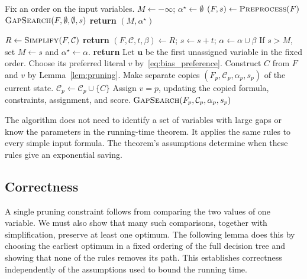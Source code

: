 \documentclass[11pt,a4paper]{article}
\theoremstyle{definition}
\theoremstyle{remark}
\begin{document}
\begin{algorithm}[H]
\caption{\textnormal{\textsc{LiteralGap}}$(F)$}\label{alg:literal_gap}
\begin{algorithmic}[1]
\STATE Fix an order on the input variables.
\STATE $M\gets-\infty$; $\alpha^\star\gets\emptyset$
\STATE $(F,s)\gets\textnormal{\textsc{Preprocess}}(F)$
\STATE $\textnormal{\textsc{GapSearch}}(F,\emptyset,\emptyset,s)$
\STATE \textbf{return} $(M,\alpha^\star)$
\end{algorithmic}
\end{algorithm}

\begin{algorithm}[H]
\caption{\textnormal{\textsc{GapSearch}}$(F,\mathcal C,\alpha,s)$}
\label{alg:gap_search}\label{alg:bias}
\begin{algorithmic}[1]
\STATE $R\gets\textnormal{\textsc{Simplify}}(F,\mathcal C)$
  \STATE \textbf{return}
\ENDIF
\STATE $(F,\mathcal C,t,\beta)\gets R$; $s\gets s+t$; $\alpha\gets\alpha\cup\beta$
  \STATE If $s>M$, set $M\gets s$ and $\alpha^\star\gets\alpha$.
  \STATE \textbf{return}
\ENDIF
\STATE Let $\mathbf u$ be the first unassigned variable in the fixed order.
\STATE Choose its preferred literal $v$ by~\eqref{eq:bias_preference}.
\STATE Construct $C$ from $F$ and $v$ by Lemma~\ref{lem:pruning}.
  \STATE Make separate copies $(F_p,\mathcal C_p,\alpha_p,s_p)$ of the current state.
    \STATE $\mathcal C_p\gets\mathcal C_p\cup\{C\}$
  \ENDIF
  \STATE Assign $v=p$, updating the copied formula, constraints, assignment, and score.
  \STATE $\textnormal{\textsc{GapSearch}}(F_p,\mathcal C_p,\alpha_p,s_p)$
\ENDFOR
\end{algorithmic}
\end{algorithm}

The algorithm does not need to identify a set of variables with large gaps
or know the parameters in the running-time theorem. It applies the same
rules to every simple input formula. The theorem's assumptions determine
when these rules give an exponential saving.

\subsection{Correctness}

A single pruning constraint follows from comparing the two values of one
variable. We must also show that many such comparisons, together with
simplification, preserve at least one optimum. The following lemma does
this by choosing the earliest optimum in a fixed ordering of the full
decision tree and showing that none of the rules removes its path. This
establishes correctness independently of the assumptions used to bound
the running time.
\end{document}
